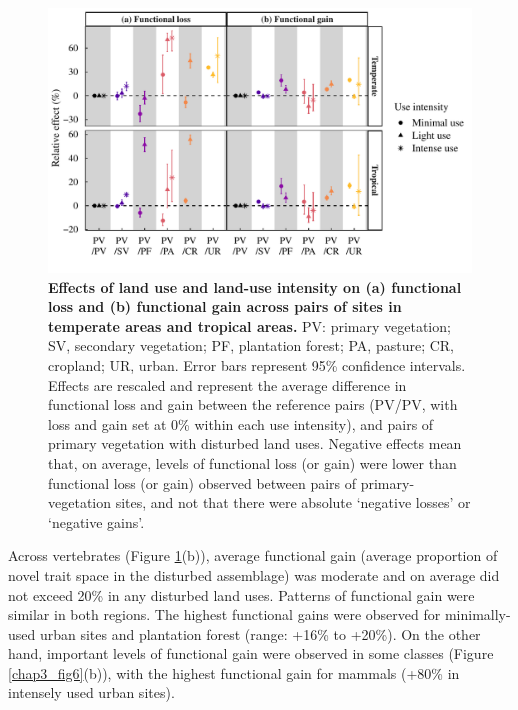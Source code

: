 \begin{figure}[h!]
\centering
\includegraphics[scale=0.75]{figures/Chapter_FD/Figure5}
\caption[Effects of land use and land-use intensity on (a) functional loss and (b) functional gain across pairs of sites in temperate areas and tropical areas.]{\textbf{Effects of land use and land-use intensity on (a) functional loss and (b) functional gain across pairs of sites in temperate areas and tropical areas.} PV: primary vegetation; SV, secondary vegetation; PF, plantation forest; PA, pasture; CR, cropland; UR, urban. Error bars represent 95\% confidence intervals. Effects are rescaled and represent the average difference in functional loss and gain between the reference pairs (PV/PV, with loss and gain set at 0\% within each use intensity), and pairs of primary vegetation with disturbed land uses. Negative effects mean that, on average, levels of functional loss (or gain) were lower than functional loss (or gain) observed between pairs of primary-vegetation sites, and not that there were absolute `negative losses' or `negative gains'.}
\label{chap3_fig5}
\end{figure}

Across vertebrates (Figure \ref{chap3_fig5}(b)), average functional gain (average proportion of novel trait space in the disturbed assemblage) was moderate and on average did not exceed 20\% in any disturbed land uses. Patterns of functional gain were similar in both regions. The highest functional gains were observed for minimally-used urban sites and plantation forest (range: +16\% to +20\%). On the other hand, important levels of functional gain were observed in some classes (Figure \ref{chap3_fig6}(b)), with the highest functional gain for mammals (+80\% in intensely used urban sites).

